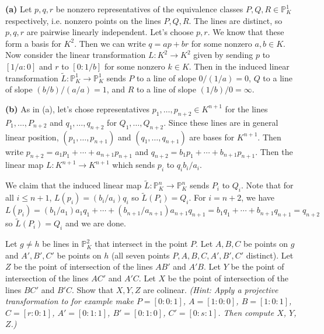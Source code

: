 \documentclass[11pt,letterpaper]{article}
\begin{document}
\begin{solution}
    \textbf{(a)} Let $p,q,r$ be nonzero representatives of the equivalence classes $P,Q,R\in \mathbb{P}^1_K$ respectively, i.e. nonzero points on the lines $P,Q,R$. The lines are distinct, so $p,q,r$ are pairwise linearly independent. Let's choose $p,r$. We know that these form a basis for $K^2$. Then we can write $q=ap+br$ for some nonzero  $a,b\in K$. Now consider the linear transformation $L : K^2 \to K^2$ given by sending $p$ to $[1/a: 0]$ and $r$ to $[0: 1/b]$ for some nonzero $k\in K$. Then in the induced linear transformation $\widetilde{L} : \mathbb{P}_K^1 \to \mathbb{P}_K^1$ sends $P$ to a line of slope $0/(1/a) = 0$, $Q$ to a line of slope $(b/b)/(a/a)=1$, and $R$ to a line of slope $(1/b)/0=\infty$.

    \textbf{(b)} As in (a), let's chose representatives $p_1,\ldots,p_{n+2}\in K^{n+1}$ for the lines $P_1,\ldots,P_{n+2}$ and $q_1,\ldots,q_{n+2}$ for $Q_1,\ldots,Q_{n+2}$. Since these lines are in general linear position, $(p_1,\ldots,p_{n+1})$ and $(q_1,\ldots,q_{n+1})$ are bases for $K^{n+1}$. Then write $p_{n+2}=a_1p_1+\cdots+a_{n+1}p_{n+1}$ and $q_{n+2}=b_1p_1+\cdots+b_{n+1}p_{n+1}$. Then the linear map $L : K^{n+1} \to K^{n+1}$ which sends $p_i$ to $q_i b_i / a_i$. 

    We claim that the induced linear map $\widetilde{L} : \mathbb{P}^n_K \to \mathbb{P}^n_K$ sends $P_i$ to $Q_i$. Note that for all $i\leq n+1$, $L(p_i)=(b_i/a_i)q_i$ so $\widetilde{L}(P_i)=Q_i$. For $i=n+2$, we have $L(p_i)=(b_1/a_1)a_1q_1+\cdots+(b_{n+1}/a_{n+1})a_{n+1}q_{n+1}=b_1q_1+\cdots+b_{n+1}q_{n+1}=q_{n+2}$ so $\widetilde{L}(P_i)=Q_i$ and we are done.
\end{solution}

\begin{problem}
    Let $g\neq h$ be lines in $\mathbb P^2_K$ that intersect in the point $P$. Let $A,B,C$ be points on $g$ and $A',B',C'$ be points on $h$ (all seven points $P,A,B,C,A',B',C'$ distinct). Let $Z$ be the point of intersection of the lines $AB'$ and $A'B$. Let $Y$ be the point of intersection of the lines $AC'$ and $A'C$. Let $X$ be the point of intersection of the lines $BC'$ and $B'C$. Show that $X,Y,Z$ are colinear. \textit{(Hint: Apply a projective transformation to for example make $P=[0:0:1]$, $A=[1:0:0]$, $B=[1:0:1]$, $C=[r:0:1]$, $A'=[0:1:1]$, $B'=[0:1:0]$, $C'=[0:s:1]$. Then compute $X$, $Y$, $Z$.)}
\end{problem}
\end{document}

